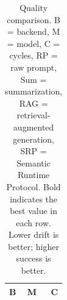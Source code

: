 \begin{table}[t]
\centering
\setlength{\tabcolsep}{3pt}
\scriptsize
\begin{tabular}{llr}
\toprule
B & M & C \\
\midrule
\bottomrule
\end{tabular}
\caption{Quality comparison. B = backend, M = model, C = cycles, RP = raw prompt, Sum = summarization, RAG = retrieval-augmented generation, SRP = Semantic Runtime Protocol. Bold indicates the best value in each row. Lower drift is better; higher success is better.}
\label{tab:srp-quality-table}
\end{table}
